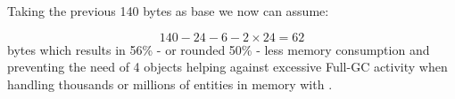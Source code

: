 Taking the previous 140 bytes as base we now can assume:

\[140-24-6-2\times24=62\] bytes which results in 56\% - or rounded 50\% - less memory consumption and preventing the need of 4 objects helping against excessive Full-GC activity when handling thousands or millions of entities in memory with \AMBETH.